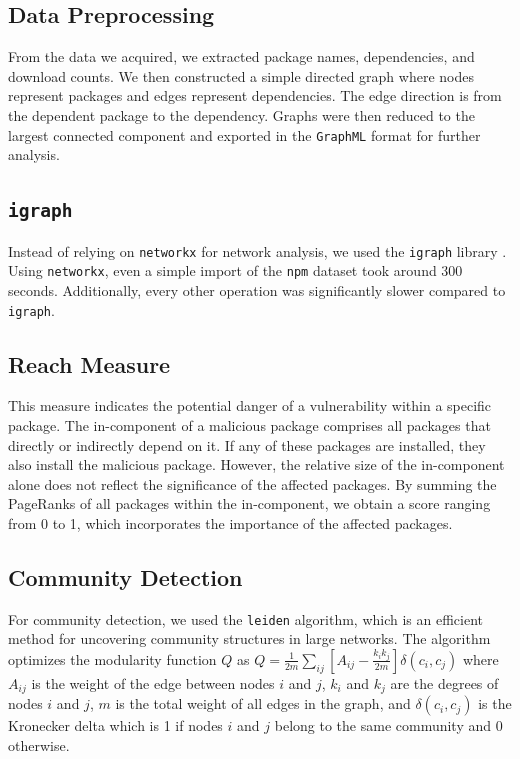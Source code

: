 \documentclass[9pt,twocolumn,twoside]{pnas-report}
\begin{document}
\subsection*{Data Preprocessing} From the data we acquired, we extracted package names, dependencies, and download counts. We then constructed a simple directed graph where nodes represent packages and edges represent dependencies. The edge direction is from the dependent package to the dependency. Graphs were then reduced to the largest connected component and exported in the \texttt{GraphML} format for further analysis.

\subsection*{\texttt{igraph}} Instead of relying on \texttt{networkx} for network analysis, we used the \texttt{igraph} library \cite{igraph}.
Using \texttt{networkx}, even a simple import of the \texttt{npm} dataset took around 300 seconds.
Additionally, every other operation was significantly slower compared to \texttt{igraph}.

\subsection*{Reach Measure} This measure indicates the potential danger of a vulnerability within a specific package.
The in-component of a malicious package comprises all packages that directly or indirectly depend on it.
If any of these packages are installed, they also install the malicious package.
However, the relative size of the in-component alone does not reflect the significance of the affected packages.
By summing the PageRanks of all packages within the in-component, we obtain a score ranging from 0 to 1, which incorporates the importance of the affected packages.


\subsection*{Community Detection} For community detection, we used the \texttt{leiden} algorithm, which is an efficient method for uncovering community structures in large networks.
The algorithm optimizes the modularity function $ Q $ as $
	Q = \frac{1}{2m} \sum_{ij} \left[ A_{ij} - \frac{k_i k_j}{2m} \right] \delta(c_i, c_j)
$
where \( A_{ij} \) is the weight of the edge between nodes \( i \) and \( j \), \( k_i \) and \( k_j \) are the degrees of nodes \( i \) and \( j \), \( m \) is the total weight of all edges in the graph, and \( \delta(c_i, c_j) \) is the Kronecker delta which is 1 if nodes \( i \) and \( j \) belong to the same community and 0 otherwise.

\normalsize



\end{document}
